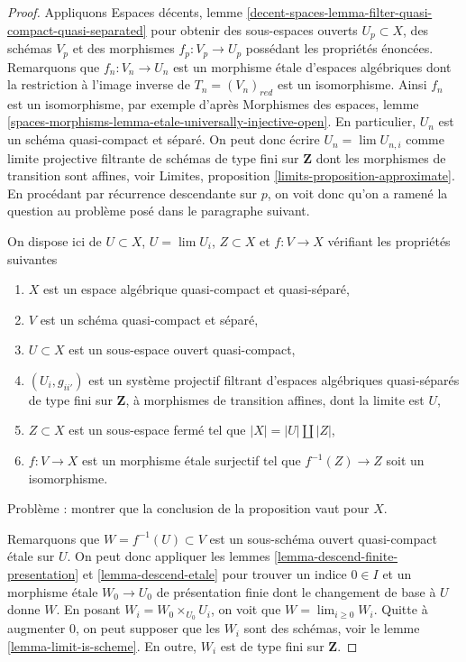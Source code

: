 \begin{proof}
Appliquons Espaces décents, lemme
\ref{decent-spaces-lemma-filter-quasi-compact-quasi-separated}
pour obtenir des sous-espaces ouverts $U_p \subset X$, des schémas $V_p$ et des morphismes
$f_p : V_p \to U_p$ possédant les propriétés énoncées. Remarquons que
$f_n : V_n \to U_n$ est un morphisme étale d'espaces algébriques
dont la restriction à l'image inverse de $T_n = (V_n)_{red}$ est un
isomorphisme. Ainsi $f_n$ est un isomorphisme, par exemple d'après
Morphismes des espaces, lemme
\ref{spaces-morphisms-lemma-etale-universally-injective-open}.
En particulier, $U_n$ est un schéma quasi-compact et séparé.
On peut donc écrire $U_n = \lim U_{n, i}$ comme limite projective filtrante
de schémas de type fini sur $\mathbf{Z}$ dont les morphismes de transition sont
affines, voir Limites, proposition \ref{limits-proposition-approximate}.
En procédant par récurrence descendante sur $p$, on voit donc qu'on a ramené
la question au problème posé dans le paragraphe suivant.

\medskip\noindent
On dispose ici de $U \subset X$, $U = \lim U_i$, $Z \subset X$ et
$f : V \to X$ vérifiant les propriétés suivantes
\begin{enumerate}
\item $X$ est un espace algébrique quasi-compact et quasi-séparé,
\item $V$ est un schéma quasi-compact et séparé,
\item $U \subset X$ est un sous-espace ouvert quasi-compact,
\item $(U_i, g_{ii'})$ est un système projectif filtrant d'espaces algébriques
quasi-séparés
de type fini sur $\mathbf{Z}$, à morphismes de transition affines,
dont la limite est $U$,
\item $Z \subset X$ est un sous-espace fermé tel que $|X| = |U| \amalg |Z|$,
\item $f : V \to X$ est un morphisme étale surjectif tel que
$f^{-1}(Z) \to Z$ soit un isomorphisme.
\end{enumerate}
Problème : montrer que la conclusion de la proposition vaut pour $X$.

\medskip\noindent
Remarquons que $W = f^{-1}(U) \subset V$ est un sous-schéma ouvert quasi-compact
étale sur $U$. On peut donc appliquer les
lemmes \ref{lemma-descend-finite-presentation} et \ref{lemma-descend-etale}
pour trouver un indice $0 \in I$ et un morphisme étale $W_0 \to U_0$
de présentation finie dont le changement de base à $U$ donne $W$. En posant
$W_i = W_0 \times_{U_0} U_i$, on voit que $W = \lim_{i \geq 0} W_i$. Quitte à
augmenter $0$, on peut supposer que les $W_i$ sont des schémas, voir le
lemme \ref{lemma-limit-is-scheme}.
En outre, $W_i$ est de type fini sur $\mathbf{Z}$.


\end{proof}
